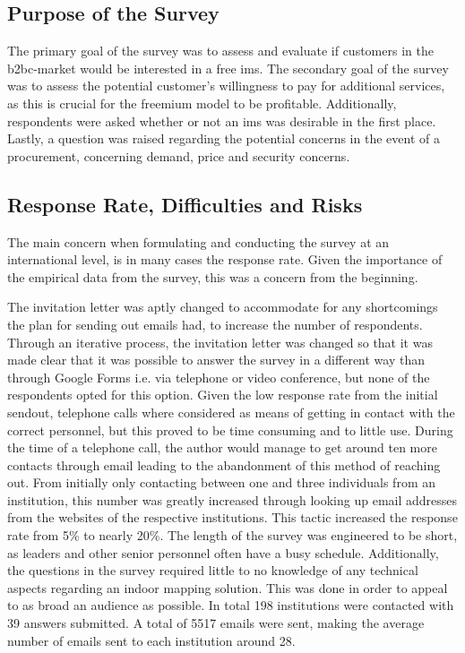 \subsection{Purpose of the Survey}
The primary goal of the survey was to assess and evaluate if customers in the \gls{b2bc}-market would be interested in a free \gls{ims}. The secondary goal of the survey was to assess the potential customer's willingness to pay for additional services, as this is crucial for the freemium model to be profitable. Additionally, respondents were asked whether or not an \gls{ims} was desirable in the first place. Lastly, a question was raised regarding the potential concerns in the event of a procurement, concerning demand, price and security concerns.

\subsection{Response Rate, Difficulties and Risks}
The main concern when formulating and conducting the survey at an international level, is in many cases the response rate. Given the importance of the empirical data from the survey, this was a concern from the beginning. 


The invitation letter was aptly changed to accommodate for any shortcomings the plan for sending out emails had, to increase the number of respondents. Through an iterative process, the invitation letter was changed so that it was made clear that it was possible to answer the survey in a different way than through Google Forms i.e. via telephone or video conference, but none of the respondents opted for this option. Given the low response rate from the initial sendout, telephone calls where considered as means of getting in contact with the correct personnel, but this proved to be time consuming and to little use. During the time of a telephone call, the author would manage to get around ten more contacts through email leading to the abandonment of this method of reaching out. From initially only contacting between one and three individuals from an institution, this number was greatly increased through looking up email addresses from the websites of the respective institutions. This tactic increased the response rate from 5\% to nearly 20\%.  The length of the survey was engineered to be short, as leaders and other senior personnel often have a busy schedule. Additionally, the questions in the survey required little to no knowledge of any technical aspects regarding an indoor mapping solution. This was done in order to appeal to as broad an audience as possible. In total 198 institutions were contacted with 39 answers submitted. A total of 5517 emails were sent, making the average number of emails sent to each institution around 28. 


